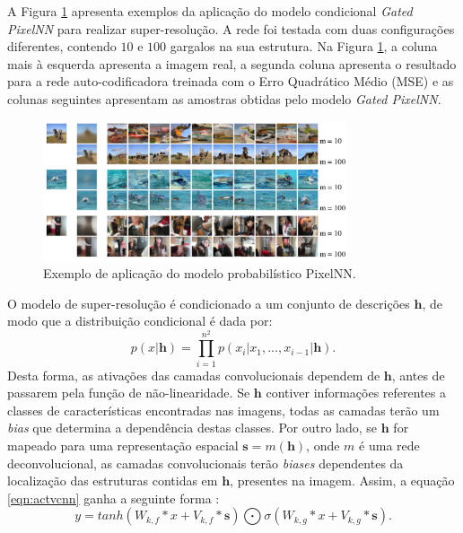 A Figura \ref{fig:example2} apresenta exemplos da aplicação do modelo condicional \textit{Gated PixelNN}
para realizar super-resolução.
A rede foi testada com duas configurações diferentes, contendo $10$ e $100$ gargalos na sua estrutura.
Na Figura \ref{fig:example2}, a coluna mais à esquerda apresenta a imagem real, a segunda coluna apresenta
o resultado para a rede auto-codificadora treinada com o Erro Quadrático Médio (MSE) e as
colunas seguintes apresentam as amostras obtidas pelo modelo \textit{Gated PixelNN}.
\begin{figure}[ht!]
\begin{center}
  \includegraphics[width=0.8\textwidth]{fig/example_superres_2}
  \caption{Exemplo de aplicação do modelo probabilístico PixelNN. \citep{Oord16}}
  \label{fig:example2}
\end{center}
\end{figure}

O modelo de super-resolução é condicionado a um conjunto de
descrições $\boldsymbol{h}$, de modo que a distribuição condicional é dada
por:
\begin{equation}
\label{eqn:prodcnncond}
p(x|\boldsymbol{h}) = \prod_{i=1}^{n^2}p(x_i|x_1,...,x_{i-1}|\boldsymbol{h}).
\end{equation}
Desta forma, as ativações das camadas convolucionais dependem de $\boldsymbol{h}$,
antes de passarem pela função de não-linearidade. Se $\boldsymbol{h}$ contiver
informações referentes a classes de características encontradas nas imagens, todas as camadas terão um \textit{bias} que determina
a dependência destas classes. Por outro lado, se $\boldsymbol{h}$ for mapeado
para uma representação espacial $\boldsymbol{s}=m(\boldsymbol{h})$, onde $m$ é uma rede
deconvolucional, as camadas convolucionais terão \textit{biases} dependentes da localização
das estruturas contidas em $\boldsymbol{h}$, presentes na imagem. Assim, a equação \ref{eqn:actvcnn}
ganha a seguinte forma \citep{Oord16}:
\begin{equation}
\label{eqn:actvcnncond}
y = tanh(W_{k,f} * x + V_{k,f}*\boldsymbol{s})\bigodot \sigma(W_{k,g}*x + V_{k,g}*\boldsymbol{s}).
\end{equation}

